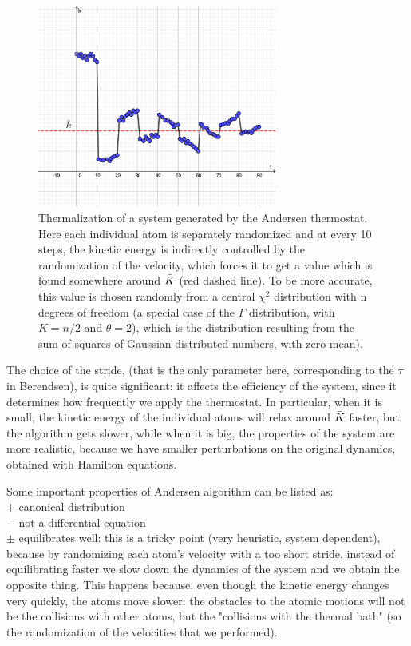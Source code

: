 \begin{figure}[H]
  \centering
  \includegraphics[width=0.7\textwidth]{Thermostats/images/thermalization.pdf}
  \caption{Thermalization of a system generated by the Andersen thermostat.\\
  Here each individual atom is separately randomized and at every 10 steps, the kinetic energy is indirectly controlled by the randomization of the velocity, which forces it to get a value which is found somewhere around $\Bar{K}$ (red dashed line). To be more accurate, this value is chosen randomly from a central $\chi ^2$ distribution with n degrees of freedom \cite{Chi-squared} (a special case of the $\Gamma$ distribution, with $K=n/2$ and $\theta=2$), which is the distribution resulting from the sum of squares of Gaussian distributed numbers, with zero mean).
  \hspace{\textwidth}}
  \label{Fig:thermalization}
\end{figure}

The choice of the stride,  (that is the only parameter here, corresponding to the $\tau$ in Berendsen), is quite significant: it affects the efficiency of the system, since it determines how frequently we apply the thermostat. In particular, when it is small, the kinetic energy of the individual atoms will relax around $\Bar{K}$ faster, but the algorithm gets slower, while when it is big, the properties of the system are more realistic, because we have smaller perturbations on the original dynamics, obtained with Hamilton equations.

Some important properties of Andersen algorithm can be listed as:\\
$+$ canonical distribution\\
$-$ not a differential equation\\
$\pm$ equilibrates well: this is a tricky point (very heuristic, system dependent), because by randomizing each atom's velocity with a too short stride, instead of equilibrating faster we slow down the dynamics of the system and we obtain the opposite thing. This happens because, even though the kinetic energy changes very quickly, the atoms move slower: the obstacles to the atomic motions will not be the collisions with other atoms, but the "collisions with the thermal bath" (so the randomization of the velocities that we performed).
\\

